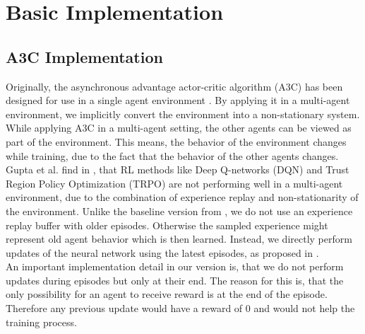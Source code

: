 

%
%

\chapter{Basic Implementation}\label{chap.basic_implementation}
\section{A3C Implementation}\label{a3c_implementation}
Originally, the asynchronous advantage actor-critic algorithm (A3C) has been designed for use in a single agent environment \cite{a3c}.
By applying it in a multi-agent environment, we implicitly convert the environment into a non-stationary system.
While applying A3C in a multi-agent setting, the other agents can be viewed as part of the environment. This means, the behavior of the environment changes while training, due to the fact that the behavior of the other agents changes.
Gupta et al. find in \cite{multiagent_comp_a3c_dqn_etc}, that RL methods like Deep Q-networks (DQN) and Trust Region Policy Optimization (TRPO) are not performing well in a multi-agent environment, due to the combination of experience replay and non-stationarity of the environment. Unlike the baseline version from \cite{flatlandstephan}, we do not use an experience replay buffer with older episodes. Otherwise the sampled experience might represent old agent behavior which is then learned. Instead, we directly perform updates of the neural network using the latest episodes, as proposed in \cite{a3c}.\\
An important implementation detail in our version is, that we do not perform updates during episodes but only at their end. The reason for this is, that the only possibility for an agent to receive reward is at the end of the episode. Therefore any previous update would have a reward of 0 and would not help the training process.

